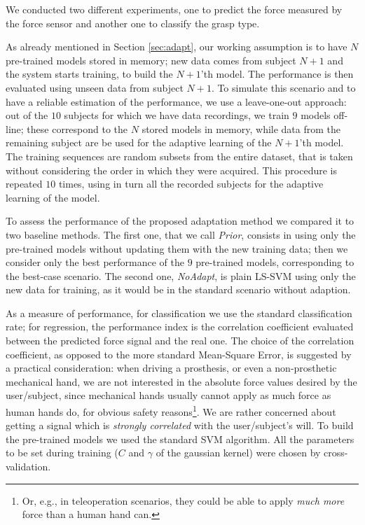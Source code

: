 We conducted two different experiments, one to predict the force measured
by the force sensor and another one to classify the grasp type.

As already mentioned in Section \ref{sec:adapt}, our working
assumption is to have $N$ pre-trained models stored in memory; new
data comes from subject $N+1$ and the system starts training, to build
the $N+1$'th model. The performance is then evaluated using unseen
data from subject $N+1$. To simulate this scenario and to have a
reliable estimation of the performance, we use a leave-one-out
approach: out of the $10$ subjects for which we have data recordings,
we train $9$ models off-line; these correspond to the $N$ stored
models in memory, while data from the remaining subject are be used
for the adaptive learning of the $N+1$'th model. The training
sequences are random subsets from the entire dataset, that is taken
without considering the order in which they were acquired. This
procedure is repeated $10$ times, using in turn all the recorded
subjects for the adaptive learning of the model.

To assess the performance of the proposed adaptation method we
compared it to two baseline methods. The first one, that we call
\emph{Prior}, consists in using only the pre-trained models without
updating them with the new training data; then we consider only the
best performance of the $9$ pre-trained models, corresponding to the
best-case scenario. The second one, \emph{NoAdapt}, is plain LS-SVM
using only the new data for training, as it would be in the standard
scenario without adaption.

As a measure of performance, for classification we use the standard
classification rate; for regression, the performance index is the
correlation coefficient evaluated between the predicted force signal
and the real one. The choice of the correlation coefficient, as
opposed to the more standard Mean-Square Error, is suggested by a
practical consideration: when driving a prosthesis, or even a
non-prosthetic mechanical hand, we are not interested in the absolute
force values desired by the user/subject, since mechanical hands
usually cannot apply as much force as human hands do, for obvious
safety reasons\footnote{Or, e.g., in teleoperation scenarios, they
could be able to apply \emph{much more} force than a human hand
can.}. We are rather concerned about getting a signal which is
\emph{strongly correlated} with the user/subject's will. To build the
pre-trained models we used the standard SVM algorithm. All the
parameters to be set during training ($C$ and $\gamma$ of the gaussian
kernel) were chosen by cross-validation.

